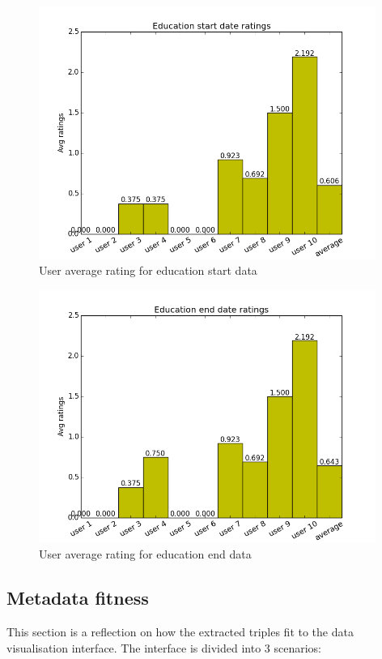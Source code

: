 \begin{figure}[H]
\centering
\includegraphics[width=110mm]{images/evaluation/average_education_start_date_score.png}
\caption{User average rating for education start data}
\label{fig:educationstart}
\end{figure}

\begin{figure}[H]
\centering
\includegraphics[width=110mm]{images/evaluation/average_education_end_date_score.png}
\caption{User average rating for education end data}
\label{fig:educationend}
\end{figure}

\subsection{Metadata fitness}

This section is a reflection on how the extracted triples fit to the data visualisation interface. The interface is divided into 3 scenarios: 

